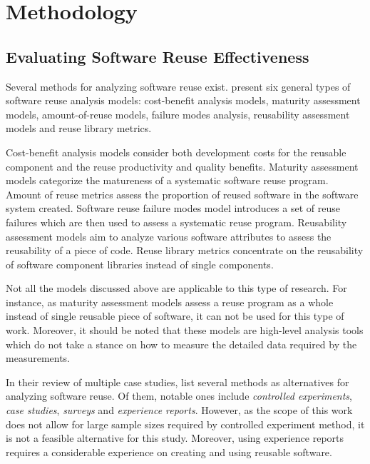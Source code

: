 
\chapter{Methodology}
\label{chapter:methods}

\section{Evaluating Software Reuse Effectiveness}

Several methods for analyzing software reuse exist. \citet{frakes_software_1996} present six general types of software reuse analysis models: cost-benefit analysis models, maturity assessment models, amount-of-reuse models, failure modes analysis, reusability assessment models and reuse library metrics. 

Cost-benefit analysis models consider both development costs for the reusable component and the reuse productivity and quality benefits. Maturity assessment models categorize the matureness of a systematic software reuse program. Amount of reuse metrics assess the proportion of reused software in the software system created. Software reuse failure modes model introduces a set of reuse failures which are then used to assess a systematic reuse program. Reusability assessment models aim to analyze various software attributes to assess the reusability of a piece of code. Reuse library metrics concentrate on the reusability of software component libraries instead of single components.

Not all the models discussed above are applicable to this type of research. For instance, as maturity assessment models assess a reuse program as a whole instead of single reusable piece of software, it can not be used for this type of work. Moreover, it should be noted that these models are high-level analysis tools which do not take a stance on how to measure the detailed data required by the measurements.

In their review of multiple case studies, \citet{mohagheghi_quality_2007} list several methods as alternatives for analyzing software reuse. Of them, notable ones include \emph{controlled experiments}, \emph{case studies}, \emph{surveys} and \emph{experience reports}. However, as the scope of this work does not allow for large sample sizes required by controlled experiment method, it is not a feasible alternative for this study. Moreover, using experience reports requires a considerable experience on creating and using reusable software.


